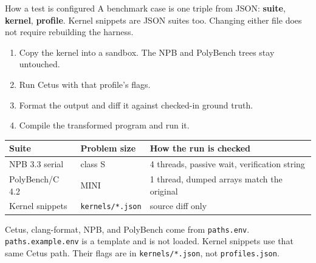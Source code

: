 \documentclass[aspectratio=169,11pt]{beamer}
\begin{document}
\begin{frame}{How a test is configured}
  A benchmark case is one triple from JSON: \textbf{suite}, \textbf{kernel}, \textbf{profile}.
  Kernel snippets are JSON suites too.
  Changing either file does not require rebuilding the harness.
  \vspace{0.45em}
  \begin{enumerate}
    \item Copy the kernel into a sandbox. The NPB and PolyBench trees stay untouched.
    \item Run Cetus with that profile's flags.
    \item Format the output and diff it against checked-in ground truth.
    \item Compile the transformed program and run it.
  \end{enumerate}
  \vspace{0.35em}
  \begin{tabular}{@{}lll@{}}
    \toprule
    Suite & Problem size & How the run is checked \\
    \midrule
    NPB 3.3 serial & class S & 4 threads, passive wait, verification string \\
    PolyBench/C 4.2 & MINI & 1 thread, dumped arrays match the original \\
    Kernel snippets & \texttt{kernels/*.json} & source diff only \\
    \bottomrule
  \end{tabular}\par
  \vspace{0.4em}
  Cetus, clang-format, NPB, and PolyBench come from \texttt{paths.env}.
  \texttt{paths.example.env} is a template and is not loaded.
  Kernel snippets use that same Cetus path.
  Their flags are in \texttt{kernels/*.json}, not \texttt{profiles.json}.
\end{frame}
\end{document}

